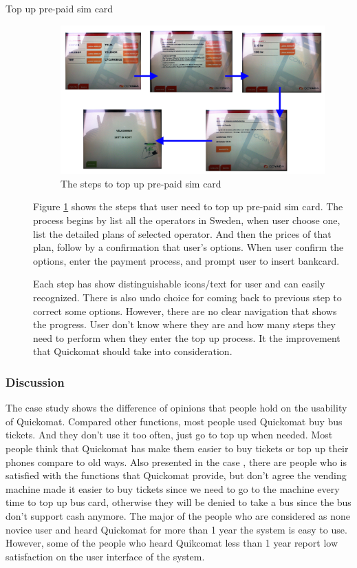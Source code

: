 \documentclass[twocolumn]{article}
\begin{document}
\begin{description}
  \item[Top up pre-paid sim card]
    \begin{figure}
      \centering
      \includegraphics[width=.8\textwidth]{fig/top-up-prepaid-sim-card.png}
      \caption{The steps to top up pre-paid sim card}
      \label{fig:top-up-prepaid-sim-card}
    \end{figure}
    Figure \ref{fig:top-up-prepaid-sim-card} shows the steps that user need to top up pre-paid sim card. The process begins by list all the operators in Sweden, when user choose one, list the detailed plans of selected operator. And then the prices of that plan, follow by a confirmation that user’s options. When user confirm the options, enter the payment process, and prompt user to insert bankcard.

    Each step has show distinguishable icons/text for user and can easily recognized. There is also undo choice for coming back to previous step to correct some options. However, there are no clear navigation that shows the progress. User don’t know where they are and how many steps they need to perform when they enter the top up process. It the improvement that Quickomat should take into consideration.
\end{description}

\subsubsection{Discussion}
The case study shows the difference of opinions that people hold on the usability of Quickomat. Compared other functions, most people used Quickomat buy bus tickets. And they don’t use it too often, just go to top up when needed. Most people think that Quickomat has make them easier to buy tickets or top up their phones compare to old ways. Also presented in the case , there are people who is satisfied with the functions that Quickomat provide, but don’t agree the vending machine made it easier to buy tickets since we need to go to the machine every time to top up bus card, otherwise they will be denied to take a bus since the bus don’t support cash anymore. The major of the people who are considered as none novice user and heard Quickomat for more than 1 year the system is easy to use. However, some of the people who heard Quikcomat less than 1 year report low satisfaction on the user interface of the system.
\end{document}
